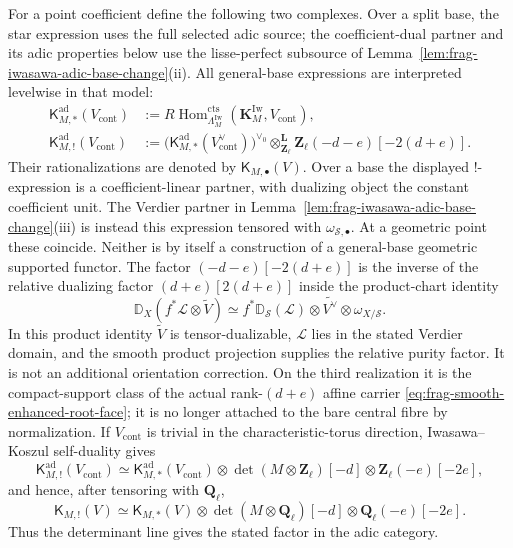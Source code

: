 \documentclass[11pt]{article}
\theoremstyle{definition}
\theoremstyle{remark}
\begin{document}
For a point coefficient define the following two complexes.  Over a
split base, the star expression uses the full selected adic source;
the coefficient-dual partner and its adic properties below use the
lisse-perfect subsource of Lemma~\ref{lem:frag-iwasawa-adic-base-change}(ii).
All general-base expressions are interpreted levelwise in that model:
\begin{align}
 \mathsf K^{\mathrm{ad}}_{M,*}(V_{\mathrm{cont}})
  &:=R\!\operatorname{Hom}^{\mathrm{cts}}_{\Lambda_M^{\mathrm{Iw}}}
       (\mathbf K_M^{\mathrm{Iw}},V_{\mathrm{cont}}),
  \label{eq:frag-koszul-star-ad}\\
 \mathsf K^{\mathrm{ad}}_{M,!}(V_{\mathrm{cont}})
  &:=\bigl(
       \mathsf K^{\mathrm{ad}}_{M,*}(V_{\mathrm{cont}}^\vee)
       \bigr)^{\vee_0}
       \otimes^{\mathbf L}_{\mathbf Z_\ell}\mathbf Z_\ell(-d-e)[-2(d+e)].
  \label{eq:frag-koszul-shriek-ad}
\end{align}
Their rationalizations are denoted by $\mathsf K_{M,\bullet}(V)$.
Over a base the displayed $!$-expression is a coefficient-linear
partner, with dualizing object the constant coefficient unit.
The Verdier partner in Lemma~\ref{lem:frag-iwasawa-adic-base-change}(iii)
is instead this expression tensored with $\omega_{\mathscr S,\bullet}$.
At a geometric point these coincide.  Neither is by itself a
construction of a general-base geometric supported functor.
The factor $(-d-e)[-2(d+e)]$ is the inverse of the relative dualizing factor
$(d+e)[2(d+e)]$ inside the product-chart identity
\[
 \mathbb D_X(f^*\mathcal L\otimes\widetilde V)
 \simeq f^*\mathbb D_{\mathscr S}(\mathcal L)\otimes
 \widetilde{V^\vee}\otimes\omega_{X/\mathscr S}.
\]
In this product identity $\widetilde V$ is tensor-dualizable,
$\mathcal L$ lies in the stated Verdier domain, and the smooth
product projection supplies the relative purity factor.
It is not an additional orientation correction.
On the third realization it is the compact-support class of the actual
rank-$(d+e)$ affine carrier \eqref{eq:frag-smooth-enhanced-root-face}; it is no
longer attached to the bare central fibre by normalization.
If $V_{\mathrm{cont}}$ is trivial in the characteristic-torus direction,
Iwasawa--Koszul self-duality gives
\begin{equation}
 \mathsf K^{\mathrm{ad}}_{M,!}(V_{\mathrm{cont}})
 \simeq
 \mathsf K^{\mathrm{ad}}_{M,*}(V_{\mathrm{cont}})\otimes
 \det(M\otimes\mathbf Z_\ell)[-d]
 \otimes\mathbf Z_\ell(-e)[-2e],
 \label{eq:frag-orientation-factor-ad}
\end{equation}
and hence, after tensoring with $\mathbf Q_\ell$,
\begin{equation}
 \mathsf K_{M,!}(V)
 \simeq
 \mathsf K_{M,*}(V)\otimes
 \det(M\otimes\mathbf Q_\ell)[-d]
 \otimes\mathbf Q_\ell(-e)[-2e].
 \label{eq:frag-orientation-factor}
\end{equation}
Thus the determinant line gives the stated factor in the adic category.
\end{document}
